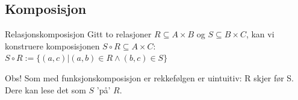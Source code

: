 \subsection{Komposisjon}

\begin{frame}{Relasjonskomposisjon}
    Gitt to relasjoner $R \subseteq A \times B$ og $S \subseteq B \times C$, kan vi konstruere komposisjonen $S \circ R \subseteq A \times C$:\\
    $S \circ R := \{(a, c) | (a, b) \in R \land (b, c) \in S\}$
    \pause
    \begin{figure}%
        \centering
        \qquad
        \label{fig:ros}%
    \end{figure}
    \pause
    Obs! Som med funksjonskomposisjon er rekkefølgen er uintuitiv: R skjer før S. Dere kan lese det som $S$ 'på' $R$.
\end{frame}

